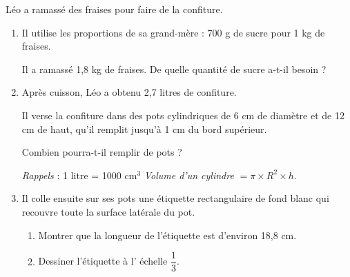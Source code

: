 
\medskip

Léo a ramassé des fraises pour faire de la confiture.

\medskip

\begin{enumerate}
\item Il utilise les proportions de sa grand-mère : 700 g de sucre pour 1 kg de fraises.

Il a ramassé 1,8 kg de fraises. De quelle quantité de sucre a-t-il besoin ?
\item  Après cuisson, Léo a obtenu 2,7 litres de confiture.

Il verse la confiture dans des pots cylindriques de 6 cm de diamètre et de
12 cm de haut, qu'il remplit jusqu'à 1 cm du bord supérieur.

Combien pourra-t-il remplir de pots ?

\emph{Rappels} : 1 litre = 1000 cm$^3$ \quad 
\emph{Volume d'un cylindre}  $= \pi \times R^2 \times h$.
\item  Il colle ensuite sur ses pots une étiquette rectangulaire de fond blanc qui recouvre toute la surface latérale du pot.
	\begin{enumerate}
		\item Montrer que la longueur de l'étiquette est d'environ 18,8 cm.
		\item Dessiner l'étiquette à l' échelle $\dfrac{1}{3}$.
	\end{enumerate} 
 \end{enumerate}
